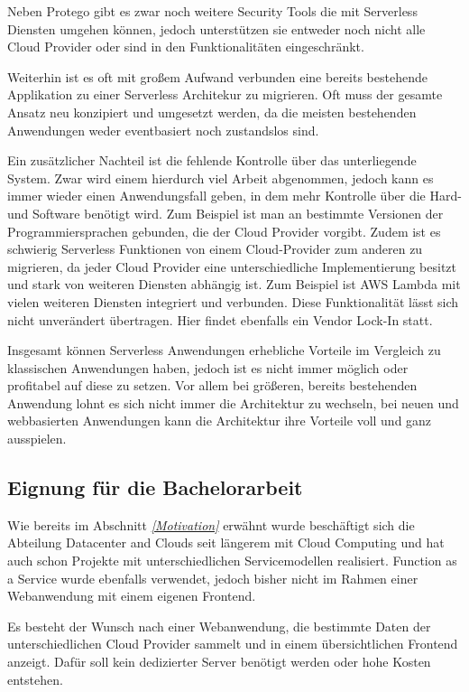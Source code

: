 Neben Protego gibt es zwar noch weitere Security Tools die mit Serverless Diensten umgehen können, jedoch unterstützen sie entweder noch nicht alle Cloud Provider oder sind in den Funktionalitäten eingeschränkt. \cite[]{Security}

Weiterhin ist es oft mit großem Aufwand verbunden eine bereits bestehende Applikation zu einer Serverless Architekur zu migrieren.
Oft muss der gesamte Ansatz neu konzipiert und umgesetzt werden, da die meisten bestehenden Anwendungen weder eventbasiert noch zustandslos sind.

Ein zusätzlicher Nachteil ist die fehlende Kontrolle über das unterliegende System.
Zwar wird einem hierdurch viel Arbeit abgenommen, jedoch kann es immer wieder einen Anwendungsfall geben, in dem mehr Kontrolle über die Hard- und Software benötigt wird.
Zum Beispiel ist man an bestimmte Versionen der Programmiersprachen gebunden, die der Cloud Provider vorgibt.
Zudem ist es schwierig Serverless Funktionen von einem Cloud-Provider zum anderen zu migrieren, da jeder Cloud Provider eine unterschiedliche Implementierung besitzt und stark von weiteren Diensten abhängig ist.
Zum Beispiel ist AWS Lambda mit vielen weiteren Diensten integriert und verbunden.
Diese Funktionalität lässt sich nicht unverändert übertragen.
Hier findet ebenfalls ein Vendor Lock-In statt.


Insgesamt können Serverless Anwendungen erhebliche Vorteile im Vergleich zu klassischen Anwendungen haben, jedoch ist es nicht immer möglich oder profitabel auf diese zu setzen.
Vor allem bei größeren, bereits bestehenden Anwendung lohnt es sich nicht immer die Architektur zu wechseln, bei neuen und webbasierten Anwendungen kann die Architektur ihre Vorteile voll und ganz ausspielen.

\subsection{Eignung für die Bachelorarbeit}
Wie bereits im Abschnitt \textit{\ref{Motivation} } erwähnt wurde beschäftigt sich die Abteilung Datacenter and Clouds seit längerem mit Cloud Computing und hat auch schon Projekte mit unterschiedlichen Servicemodellen realisiert.
Function as a Service wurde ebenfalls verwendet, jedoch bisher nicht im Rahmen einer Webanwendung mit einem eigenen Frontend.

Es besteht der Wunsch nach einer Webanwendung, die bestimmte Daten der unterschiedlichen Cloud Provider sammelt und in einem übersichtlichen Frontend anzeigt.
Dafür soll kein dedizierter Server benötigt werden oder hohe Kosten entstehen.

